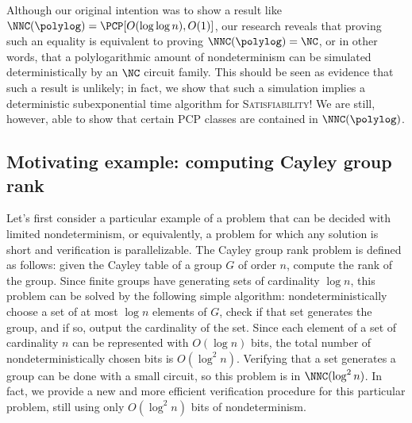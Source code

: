 \documentclass{article}
\begin{document}
Although our original intention was to show a result like $\NNC(\polylog) = \PCP[O(\log \log n), O(1)]$, our research reveals that proving such an equality is equivalent to proving $\NNC(\polylog) = \NC$, or in other words, that a polylogarithmic amount of nondeterminism can be simulated deterministically by an $\NC$ circuit family.
This should be seen as evidence that such a result is unlikely; in fact, we show that such a simulation implies a deterministic subexponential time algorithm for \textsc{Satisfiability}!
We are still, however, able to show that certain PCP classes are contained in $\NNC(\polylog)$.


\subsection{Motivating example: computing Cayley group rank}

Let's first consider a particular example of a problem that can be decided with limited nondeterminism, or equivalently, a problem for which any solution is short and verification is parallelizable.
The Cayley group rank problem is defined as follows: given the Cayley table of a group $G$ of order $n$, compute the rank of the group.
Since finite groups have generating sets of cardinality $\log n$, this problem can be solved by the following simple algorithm: nondeterministically choose a set of at most $\log n$ elements of $G$, check if that set generates the group, and if so, output the cardinality of the set.
Since each element of a set of cardinality $n$ can be represented with $O(\log n)$ bits, the total number of nondeterministically chosen bits is $O(\log^2 n)$.
Verifying that a set generates a group can be done with a small circuit, so this problem is in $\NNC(\log^2 n)$.
In fact, we provide a new and more efficient verification procedure for this particular problem, still using only $O(\log^2 n)$ bits of nondeterminism.
\end{document}
